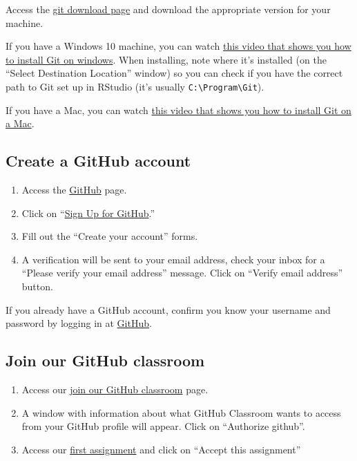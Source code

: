 \documentclass[
]{book}
\begin{document}
Access the \href{https://git-scm.com/download}{git download page} and download the appropriate version for your machine.

If you have a Windows 10 machine, you can watch \href{https://www.youtube.com/watch?v=nbFwejIsHlY}{this video that shows you how to install Git on windows}. When installing, note where it's installed (on the ``Select Destination Location'' window) so you can check if you have the correct path to Git set up in RStudio (it's usually \texttt{C:\textbackslash{}Program\textbackslash{}Git}).

If you have a Mac, you can watch \href{https://www.youtube.com/watch?v=PSULlxUk744}{this video that shows you how to install Git on a Mac}.

\hypertarget{create-a-github-account}{%
\subsection{Create a GitHub account}\label{create-a-github-account}}

\begin{enumerate}
\def\labelenumi{\arabic{enumi}.}
\item
  Access the \href{https://github.com/}{GitHub} page.
\item
  Click on ``\href{https://github.com/join}{Sign Up for GitHub}.''
\item
  Fill out the ``Create your account'' forms.
\item
  A verification will be sent to your email address, check your inbox for a ``Please verify your email address'' message. Click on ``Verify email address'' button.
\end{enumerate}

If you already have a GitHub account, confirm you know your username and password by logging in at \href{https://github.com/}{GitHub}.

\hypertarget{join-our-github-classroom}{%
\subsection{Join our GitHub classroom}\label{join-our-github-classroom}}

\begin{enumerate}
\def\labelenumi{\arabic{enumi}.}
\item
  Access our \href{https://classroom.github.com/classrooms/69162822-esoc214-classroom-1}{join our GitHub classroom} page.
\item
  A window with information about what GitHub Classroom wants to access from your GitHub profile will appear. Click on ``Authorize github''.
\item
  Access our \href{https://classroom.github.com/a/uE1b8ho7}{first assignment} and click on ``Accept this assignment''
\end{enumerate}
\end{document}
